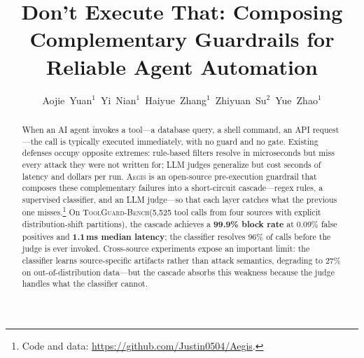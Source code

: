 \documentclass[sigconf]{acmart}
\newcommand{\system}{\textsc{Aegis}\xspace}
\newcommand{\bench}{\textsc{ToolGuard-Bench}\xspace}
\begin{document}

\title{Don't Execute That: Composing Complementary Guardrails for Reliable Agent Automation}

\renewcommand{\authorsaddresses}{}
\author{\mbox{Aojie Yuan$^1$ \hspace{1.2em} Yi Nian$^1$ \hspace{1.2em} Haiyue Zhang$^1$ \hspace{1.2em} Zhiyuan Su$^2$ \hspace{1.2em} Yue Zhao$^1$}}

\begin{abstract}
When an AI agent invokes a tool---a database query, a shell command, an API request---the call is typically executed immediately, with no guard and no gate.
Existing defenses occupy opposite extremes: rule-based filters resolve in microseconds but miss every attack they were not written for; LLM judges generalize but cost seconds of latency and dollars per run.
\system is an open-source pre-execution guardrail that composes these complementary failures into a short-circuit cascade---regex rules, a supervised classifier, and an LLM judge---so that each layer catches what the previous one misses.\footnote{Code and data: \url{https://github.com/Justin0504/Aegis}.}
On \bench (5{,}525 tool calls from four sources with explicit distribution-shift partitions), the cascade achieves a \textbf{99.9\% block rate} at 0.09\% false positives and \textbf{1.1\,ms median latency}; the classifier resolves 96\% of calls before the judge is ever invoked.
Cross-source experiments expose an important limit: the classifier learns source-specific artifacts rather than attack semantics, degrading to 27\% on out-of-distribution data---but the cascade absorbs this weakness because the judge handles what the classifier cannot.
\end{abstract}


\maketitle
\end{document}
